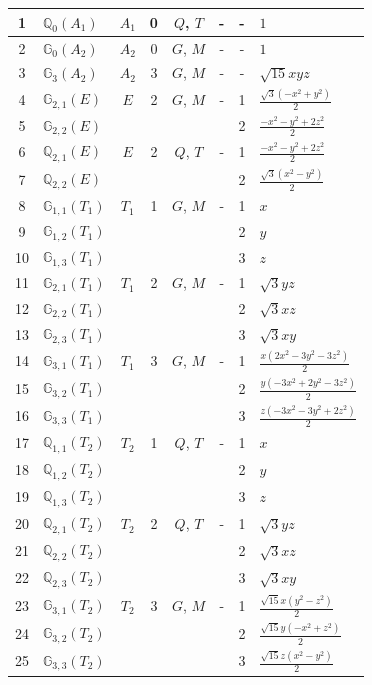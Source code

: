 \documentclass[fleqn,10pt,landscape]{jsarticle}
\begin{document}
\begin{longtable}[l]{clcccccl}
1 & $\mathbb{Q}_{0}(A_{1})$ & $A_{1}$ & 0 & $Q$, $T$ & - & - & $1$ \\ \hline
2 & $\mathbb{G}_{0}(A_{2})$ & $A_{2}$ & 0 & $G$, $M$ & - & - & $1$ \\ \hline
3 & $\mathbb{G}_{3}(A_{2})$ & $A_{2}$ & 3 & $G$, $M$ & - & - & $\sqrt{15} x y z$ \\ \hline
4 & $\mathbb{G}_{2,1}(E)$ & $E$ & 2 & $G$, $M$ & - & 1 & $\frac{\sqrt{3} \left(- x^{2} + y^{2}\right)}{2}$ \\
5 & $\mathbb{G}_{2,2}(E)$ &  &  &  &  & 2 & $\frac{- x^{2} - y^{2} + 2 z^{2}}{2}$ \\ \hline
6 & $\mathbb{Q}_{2,1}(E)$ & $E$ & 2 & $Q$, $T$ & - & 1 & $\frac{- x^{2} - y^{2} + 2 z^{2}}{2}$ \\
7 & $\mathbb{Q}_{2,2}(E)$ &  &  &  &  & 2 & $\frac{\sqrt{3} \left(x^{2} - y^{2}\right)}{2}$ \\ \hline
8 & $\mathbb{G}_{1,1}(T_{1})$ & $T_{1}$ & 1 & $G$, $M$ & - & 1 & $x$ \\
9 & $\mathbb{G}_{1,2}(T_{1})$ &  &  &  &  & 2 & $y$ \\
10 & $\mathbb{G}_{1,3}(T_{1})$ &  &  &  &  & 3 & $z$ \\ \hline
11 & $\mathbb{G}_{2,1}(T_{1})$ & $T_{1}$ & 2 & $G$, $M$ & - & 1 & $\sqrt{3} y z$ \\
12 & $\mathbb{G}_{2,2}(T_{1})$ &  &  &  &  & 2 & $\sqrt{3} x z$ \\
13 & $\mathbb{G}_{2,3}(T_{1})$ &  &  &  &  & 3 & $\sqrt{3} x y$ \\ \hline
14 & $\mathbb{G}_{3,1}(T_{1})$ & $T_{1}$ & 3 & $G$, $M$ & - & 1 & $\frac{x \left(2 x^{2} - 3 y^{2} - 3 z^{2}\right)}{2}$ \\
15 & $\mathbb{G}_{3,2}(T_{1})$ &  &  &  &  & 2 & $\frac{y \left(- 3 x^{2} + 2 y^{2} - 3 z^{2}\right)}{2}$ \\
16 & $\mathbb{G}_{3,3}(T_{1})$ &  &  &  &  & 3 & $\frac{z \left(- 3 x^{2} - 3 y^{2} + 2 z^{2}\right)}{2}$ \\ \hline
17 & $\mathbb{Q}_{1,1}(T_{2})$ & $T_{2}$ & 1 & $Q$, $T$ & - & 1 & $x$ \\
18 & $\mathbb{Q}_{1,2}(T_{2})$ &  &  &  &  & 2 & $y$ \\
19 & $\mathbb{Q}_{1,3}(T_{2})$ &  &  &  &  & 3 & $z$ \\ \hline
20 & $\mathbb{Q}_{2,1}(T_{2})$ & $T_{2}$ & 2 & $Q$, $T$ & - & 1 & $\sqrt{3} y z$ \\
21 & $\mathbb{Q}_{2,2}(T_{2})$ &  &  &  &  & 2 & $\sqrt{3} x z$ \\
22 & $\mathbb{Q}_{2,3}(T_{2})$ &  &  &  &  & 3 & $\sqrt{3} x y$ \\ \hline
23 & $\mathbb{G}_{3,1}(T_{2})$ & $T_{2}$ & 3 & $G$, $M$ & - & 1 & $\frac{\sqrt{15} x \left(y^{2} - z^{2}\right)}{2}$ \\
24 & $\mathbb{G}_{3,2}(T_{2})$ &  &  &  &  & 2 & $\frac{\sqrt{15} y \left(- x^{2} + z^{2}\right)}{2}$ \\
25 & $\mathbb{G}_{3,3}(T_{2})$ &  &  &  &  & 3 & $\frac{\sqrt{15} z \left(x^{2} - y^{2}\right)}{2}$ \\
\end{longtable}
\end{document}
